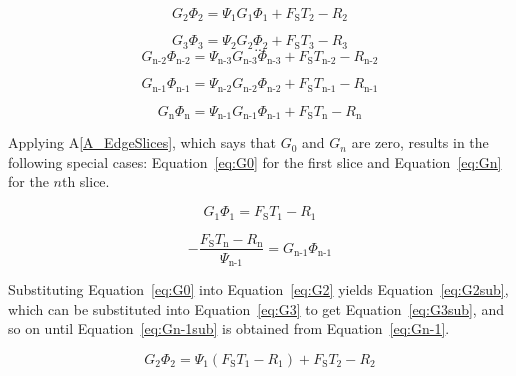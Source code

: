 \documentclass[12pt]{article}
\newcommand{\aref}[1]{A\ref{#1}}
\begin{document}
\begin{equation} \label{eq:G2}
G_\text{2} \Phi_\text{2} = \Psi_\text{1} G_\text{1} \Phi_\text{1} + F_\text{S} 
T_\text{2} - R_\text{2}
\end{equation}

\begin{equation} \label{eq:G3}
G_\text{3} \Phi_\text{3} = \Psi_\text{2} G_\text{2} \Phi_\text{2} + F_\text{S} 
T_\text{3} - R_\text{3}
\end{equation}
\begin{equation*}
...
\end{equation*}
\begin{equation} \label{eq:Gn-2}
G_\text{n-2} \Phi_\text{n-2} = \Psi_\text{n-3} G_\text{n-3} 
\Phi_\text{n-3} + F_\text{S} T_\text{n-2} - R_\text{n-2}
\end{equation}

\begin{equation} \label{eq:Gn-1}
G_\text{n-1} \Phi_\text{n-1} = \Psi_\text{n-2} G_\text{n-2} 
\Phi_\text{n-2} + F_\text{S} T_\text{n-1} - R_\text{n-1}
\end{equation}

\begin{equation*}
G_\text{n} \Phi_\text{n} = \Psi_\text{n-1} G_\text{n-1} \Phi_\text{n-1} + 
F_\text{S} T_\text{n} - R_\text{n}
\end{equation*}

\noindent Applying \aref{A_EdgeSlices}, which says that $G_{0}$ and $G_{n}$ are 
zero, results in the following special cases: Equation~\ref{eq:G0} for the 
first slice and Equation~\ref{eq:Gn} for the $n$th slice.

\begin{equation} \label{eq:G0}
G_\text{1} \Phi_\text{1} = F_\text{S} T_\text{1} - R_\text{1}
\end{equation}

\begin{equation} \label{eq:Gn}
- \frac{F_\text{S} T_\text{n} - R_\text{n}}{\Psi_\text{n-1} } = G_\text{n-1} 
\Phi_\text{n-1}
\end{equation}

\noindent Substituting Equation~\ref{eq:G0} into Equation~\ref{eq:G2} yields 
Equation~\ref{eq:G2sub}, which can be substituted into Equation~\ref{eq:G3} to 
get Equation~\ref{eq:G3sub}, and so on until Equation~\ref{eq:Gn-1sub} is 
obtained from Equation~\ref{eq:Gn-1}.

\begin{equation} \label{eq:G2sub}
G_\text{2} \Phi_\text{2} = \Psi_\text{1} \left(F_\text{S} T_\text{1} - 
R_\text{1} 
\right) + F_\text{S} T_\text{2} - R_\text{2}
\end{equation}
\end{document}
